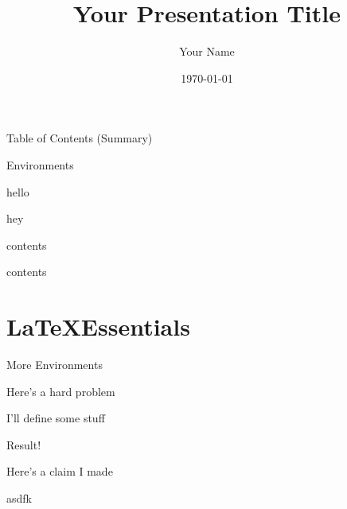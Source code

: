 \documentclass[12pt, aspectratio = 169]{beamer}
\title[Short title]{Your Presentation Title}
\author{Your Name}
\institute[Pomona]{Pomona College}
\date{\today}
\begin{document}

\maketitle

\begin{frame}{Table of Contents (Summary)}
\tableofcontents
\end{frame}

\begin{frame}{Environments}
    \begin{theorem}
    hello
    \end{theorem}
    \begin{lemma}
    hey
    \end{lemma}
    \begin{prop}
    contents
    \end{prop}
    \begin{cor}
    contents
    \end{cor}
\end{frame}

\section{\LaTeX Essentials}


\begin{frame}{More Environments}
	\begin{pro}
	Here's a hard problem
	\end{pro}
	\begin{defi}
	I'll define some stuff
	\end{defi}
	\begin{res}
	Result!
	\end{res}
	\begin{cl}
	Here's a claim I made
	\end{cl}
	\begin{mq}
	asdfk
	\end{mq}
\end{frame}
\end{document}
